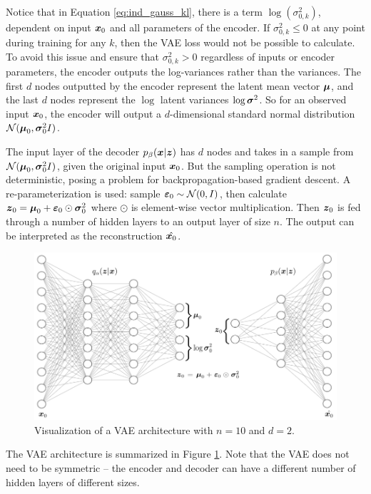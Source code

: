 Notice that in Equation \ref{eq:ind_gauss_kl}, there is a term $\log(\sigma_{0,k}^2)$, dependent on input $\boldsymbol{x}_0$ and all parameters of the encoder. If $\sigma_{0,k}^2 \leq 0$ at any point during training for any $k$, then the VAE loss would not be possible to calculate. To avoid this issue and ensure that $\sigma_{0,k}^2 > 0$ regardless of inputs or encoder parameters, the encoder outputs the log-variances rather than the variances. The first $d$ nodes outputted by the encoder represent the latent mean vector $\boldsymbol{\mu}$, and the last $d$ nodes represent the $\log$ latent variances $\log \boldsymbol{\sigma}^2$. So for an observed input $\boldsymbol{x}_0$, the encoder will output a $d$-dimensional standard normal distribution $\mathcal{N}(\boldsymbol{\mu}_0, \boldsymbol{\sigma}_0^2I)$.

The input layer of the decoder $p_\beta(\boldsymbol{x} | \boldsymbol{z})$ has $d$ nodes and takes in a sample from $\mathcal{N}(\boldsymbol{\mu}_0, \boldsymbol{\sigma}_0^2I)$, given the original input $\boldsymbol{x}_0$. But the sampling operation is not deterministic, posing a problem for backpropagation-based gradient descent. A re-parameterization is used: sample $\boldsymbol{\varepsilon}_0 \sim \mathcal{N}(0,I)$, then calculate $\boldsymbol{z}_0 = \boldsymbol{\mu}_0 + \boldsymbol{\varepsilon}_0 \odot \boldsymbol{\sigma}_0^2$ where $\odot$ is element-wise vector multiplication. Then $\boldsymbol{z}_0$ is fed through a number of hidden layers to an output layer of size $n$. The output can be interpreted as the reconstruction $\hat{\boldsymbol{x}_0}$.

\begin{figure}[h]
  \centering
  \includegraphics[width=.95\textwidth]{img/vae_visual.png}
  \caption{Visualization of a VAE architecture with $n=10$ and $d=2$.}
  \label{fig:vae_visual}
\end{figure}
The VAE architecture is summarized in Figure \ref{fig:vae_visual}. Note that the VAE does not need to be symmetric -- the encoder and decoder can have a different number of hidden layers of different sizes.


